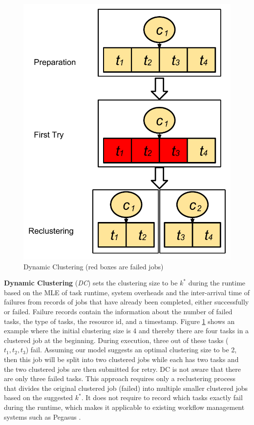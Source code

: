 \documentclass{IOS-Book-Article}
\begin{document}
\begin{figure}[!htb]
\centering
  \includegraphics[width=0.55\linewidth]{dc.pdf}
  \caption{Dynamic Clustering (red boxes are failed jobs)}
  \label{fig:clustering_dc}
\end{figure}
\textbf{Dynamic Clustering} (\emph{DC}) sets the clustering size to be $k^*$ during the runtime based on the MLE of task runtime, system overheads and the inter-arrival time of failures from records of jobs that have already been completed, either successfully or failed. Failure records contain the information about the number of failed tasks, the type of tasks, the resource id, and a timestamp. 
Figure \ref{fig:clustering_dc} shows an example where the initial clustering size is 4 and thereby there are four tasks in a clustered job at the beginning. During execution, three out of these tasks ($t_1, t_2, t_3$) fail. Assuming our model suggests an optimal clustering size to be 2, then this job will be split into two clustered jobs while each has two tasks and the two clustered jobs are then submitted for retry. DC is not aware that there are only three failed tasks. This approach requires only a reclustering process that divides the original clustered job (failed) into multiple smaller clustered jobs based on the suggested $k^*$. It does not require to record which tasks exactly fail during the runtime, which makes it applicable to existing workflow management systems such as Pegasus \cite{Deelman2004}. 
\end{document}
